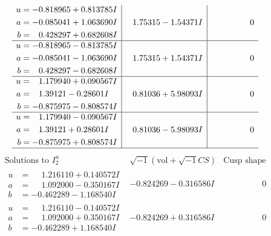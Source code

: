 \documentclass[1p]{elsarticle_modified}
\theoremstyle{definition}
\newcommand{\I}{\sqrt{-1}}
\begin{document}
$$\begin{array}{c|c|c}
\begin{aligned}
u &= -0.818965 + 0.813785 I \\
a &= -0.085041 + 1.063690 I \\
b &= \phantom{-}0.428297 + 0.682608 I\end{aligned}
 & \phantom{-}1.75315 - 1.54371 I & \phantom{-0.000000 } 0 \\ \hline\begin{aligned}
u &= -0.818965 - 0.813785 I \\
a &= -0.085041 - 1.063690 I \\
b &= \phantom{-}0.428297 - 0.682608 I\end{aligned}
 & \phantom{-}1.75315 + 1.54371 I & \phantom{-0.000000 } 0 \\ \hline\begin{aligned}
u &= \phantom{-}1.179940 + 0.090567 I \\
a &= \phantom{-}1.39121 - 0.28601 I \\
b &= -0.875975 - 0.808574 I\end{aligned}
 & \phantom{-}0.81036 + 5.98093 I & \phantom{-0.000000 } 0 \\ \hline\begin{aligned}
u &= \phantom{-}1.179940 - 0.090567 I \\
a &= \phantom{-}1.39121 + 0.28601 I \\
b &= -0.875975 + 0.808574 I\end{aligned}
 & \phantom{-}0.81036 - 5.98093 I & \phantom{-0.000000 } 0\\
 \hline 
 \end{array}$$\newpage$$\begin{array}{c|c|c}  
\text{Solutions to }I^u_{2}& \I (\text{vol} + \sqrt{-1}CS) & \text{Cusp shape}\\
 \hline 
\begin{aligned}
u &= \phantom{-}1.216110 + 0.140572 I \\
a &= \phantom{-}1.092000 - 0.350167 I \\
b &= -0.462289 - 1.168540 I\end{aligned}
 & -0.824269 - 0.316586 I & \phantom{-0.000000 } 0 \\ \hline\begin{aligned}
u &= \phantom{-}1.216110 - 0.140572 I \\
a &= \phantom{-}1.092000 + 0.350167 I \\
b &= -0.462289 + 1.168540 I\end{aligned}
 & -0.824269 + 0.316586 I & \phantom{-0.000000 } 0 \\ \hline\begin{aligned}

\end{aligned}
\end{array}$$
\end{document}
